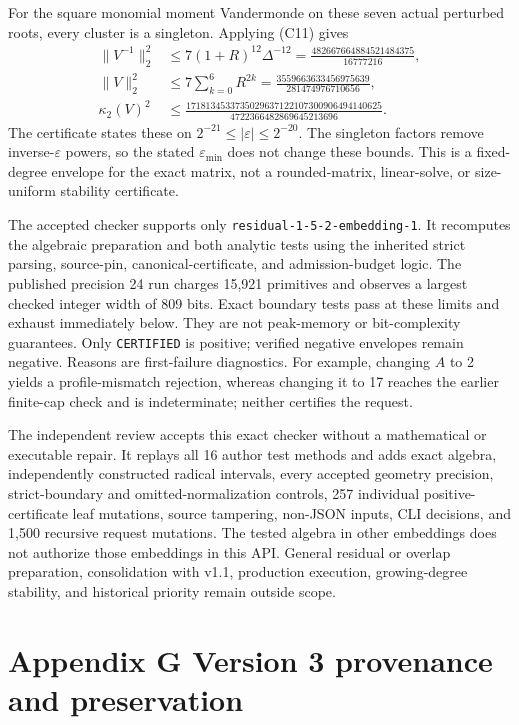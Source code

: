 \documentclass[
  11pt,
]{article}
\begin{document}
For the square monomial moment Vandermonde on these seven actual perturbed
roots, every cluster is a singleton. Applying (C11) gives
\begin{align*}
\|V^{-1}\|_2^2&\leq7(1+R)^{12}\Delta^{-12}
=\frac{482667664884521484375}{16777216},\\
\|V\|_2^2&\leq7\sum_{k=0}^6R^{2k}
=\frac{3559663633456975639}{281474976710656},\\
\kappa_2(V)^2&\leq
\frac{1718134533735029637122107300906494140625}
{4722366482869645213696}.
\end{align*}
The certificate states these on
\(2^{-21}\leq|\varepsilon|\leq2^{-20}\). The singleton factors
remove inverse-\(\varepsilon\) powers, so the stated
\(\varepsilon_{\min}\) does not change these bounds. This is a
fixed-degree envelope for the exact matrix, not a rounded-matrix,
linear-solve, or size-uniform stability certificate.

The accepted checker supports only
\texttt{residual-1-5-2-embedding-1}. It recomputes the algebraic preparation
and both analytic tests using the inherited strict parsing, source-pin,
canonical-certificate, and admission-budget logic. The published precision
24 run charges 15,921 primitives and observes a largest checked integer
width of 809 bits. Exact boundary tests pass at these limits and exhaust
immediately below. They are not peak-memory or bit-complexity guarantees.
Only \texttt{CERTIFIED} is positive; verified negative envelopes remain
negative. Reasons are first-failure diagnostics. For example, changing
\(A\) to 2 yields a profile-mismatch rejection, whereas changing it to
17 reaches the earlier finite-cap check and is indeterminate; neither
certifies the request.

The independent review accepts this exact checker without a mathematical
or executable repair. It replays all 16 author test methods and adds exact
algebra, independently constructed radical intervals, every accepted
geometry precision, strict-boundary and omitted-normalization controls,
257 individual positive-certificate leaf mutations, source tampering,
non-JSON inputs, CLI decisions, and 1,500 recursive request mutations.
The tested algebra in other embeddings does not authorize those embeddings
in this API. General residual or overlap preparation, consolidation with
v1.1, production execution, growing-degree stability, and historical
priority remain outside scope.

\clearpage
\section{Appendix G Version 3 provenance and preservation}
\end{document}
